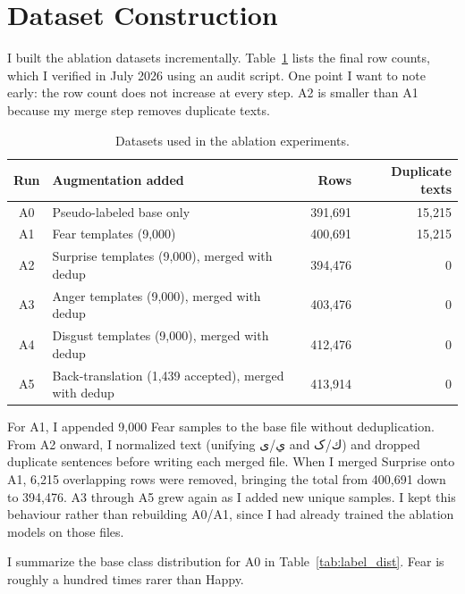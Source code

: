 \documentclass[11pt,a4paper]{article}
\begin{document}
\section{Dataset Construction}
\label{sec:datasets}

I built the ablation datasets incrementally. Table~\ref{tab:ablation_datasets} lists the final row counts, which I verified in July 2026 using an audit script. One point I want to note early: the row count does not increase at every step. A2 is smaller than A1 because my merge step removes duplicate texts.

\begin{table}[H]
\centering
\caption{Datasets used in the ablation experiments.}
\label{tab:ablation_datasets}
\begin{tabular}{@{}clrr@{}}
\toprule
Run & Augmentation added & Rows & Duplicate texts \\
\midrule
A0 & Pseudo-labeled base only & 391,691 & 15,215 \\
A1 & Fear templates (9,000) & 400,691 & 15,215 \\
A2 & Surprise templates (9,000), merged with dedup & 394,476 & 0 \\
A3 & Anger templates (9,000), merged with dedup & 403,476 & 0 \\
A4 & Disgust templates (9,000), merged with dedup & 412,476 & 0 \\
A5 & Back-translation (1,439 accepted), merged with dedup & 413,914 & 0 \\
\bottomrule
\end{tabular}
\end{table}

For A1, I appended 9,000 Fear samples to the base file without deduplication. From A2 onward, I normalized text (unifying ي/ی and ك/ک) and dropped duplicate sentences before writing each merged file. When I merged Surprise onto A1, 6,215 overlapping rows were removed, bringing the total from 400,691 down to 394,476. A3 through A5 grew again as I added new unique samples. I kept this behaviour rather than rebuilding A0/A1, since I had already trained the ablation models on those files.

I summarize the base class distribution for A0 in Table~\ref{tab:label_dist}. Fear is roughly a hundred times rarer than Happy.
\end{document}
